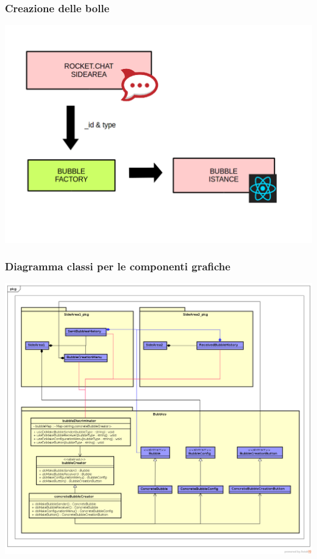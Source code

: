\begin{frame}
  \frametitle{Creazione delle bolle }
  \begin{center}
    \includegraphics[scale=0.28]{img/4bubbles.png}
  \end{center}
\end{frame}

\begin{frame}
  \frametitle{Diagramma classi per le componenti grafiche }
  \begin{center}
    \includegraphics[scale=0.20]{img/Bubbles.png}
  \end{center}
\end{frame}


